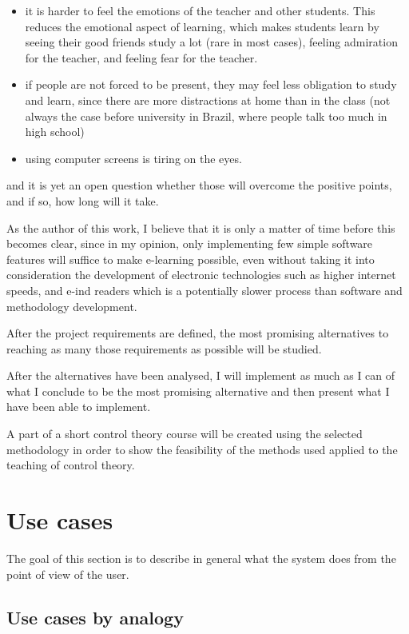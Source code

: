 \documentclass[12pt]{article}
\begin{document}
\begin{itemize}
  \item it is harder to feel the emotions of the teacher and other students. This reduces the emotional aspect of learning, which makes students learn by seeing their good friends study a lot (rare in most cases), feeling admiration for the teacher, and feeling fear for the teacher.
  \item if people are not forced to be present, they may feel less obligation to study and learn, since there are more distractions at home than in the class (not always the case before university in Brazil, where people talk too much in high school)
  \item using computer screens is tiring on the eyes.
\end{itemize}

and it is yet an open question whether those will overcome the positive points, and if so, how long will it take.

As the author of this work, I believe that it is only a matter of time before this becomes clear, since in my opinion, only implementing few simple software features will suffice to make e-learning possible, even without taking it into consideration the development of electronic technologies such as higher internet speeds, and e-ind readers which is a potentially slower process than software and methodology development.

After the project requirements are defined, the most promising alternatives to reaching as many those requirements as possible will be studied.

After the alternatives have been analysed, I will implement as much as I can of what I conclude to be the most promising alternative and then present what I have been able to implement.

A part of a short control theory course will be created using the selected methodology in order to show the feasibility of the methods used applied to the teaching of control theory.

\section{Use cases} \label{use-cases}

The goal of this section is to describe in general what the system does from the point of view of the user.

\subsection{Use cases by analogy} \label{use-cases-analogy}
\end{document}
